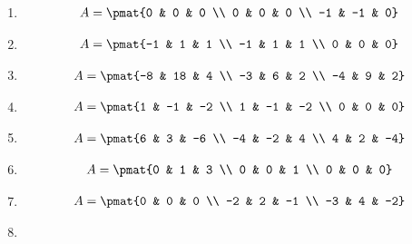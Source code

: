 \begin{enumerate}
\item

\begin{align*}
A = \pmat{0 & 0 & 0 \\ 0 & 0 & 0 \\ -1 & -1 & 0}
\end{align*}

\item

\begin{align*}
A = \pmat{-1 & 1 & 1 \\ -1 & 1 & 1 \\ 0 & 0 & 0}
\end{align*}

\item

\begin{align*}
A = \pmat{-8 & 18 & 4 \\ -3 & 6 & 2 \\ -4 & 9 & 2}
\end{align*}

\item

\begin{align*}
A = \pmat{1 & -1 & -2 \\ 1 & -1 & -2 \\ 0 & 0 & 0}
\end{align*}

\item

\begin{align*}
A = \pmat{6 & 3 & -6 \\ -4 & -2 & 4 \\ 4 & 2 & -4}
\end{align*}

\item

\begin{align*}
A = \pmat{0 & 1 & 3 \\ 0 & 0 & 1 \\ 0 & 0 & 0}
\end{align*}

\item

\begin{align*}
A = \pmat{0 & 0 & 0 \\ -2 & 2 & -1 \\ -3 & 4 & -2}
\end{align*}

\item


\end{enumerate}
